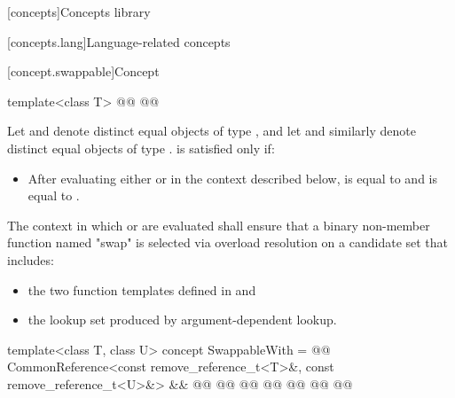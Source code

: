 
\setcounter{chapter}{21}
[concepts]{Concepts library}

\setcounter{section}{2}
[concepts.lang]{Language-related concepts}

\setcounter{subsection}{10}
[concept.swappable]{Concept }


%
\begin{itemdecl}
template<class T>
@@
@@
\end{itemdecl}

{\color{remclr}
\begin{itemdescr}
\pnum
Let  and  denote distinct equal objects of type ,
and let  and  similarly denote distinct equal objects of type
.  is satisfied only if:
\begin{itemize}
\item After evaluating either  or  in the
  context described below,  is equal to  and  is
  equal to .
\end{itemize}

\pnum
The context in which  or  are evaluated shall ensure that a binary non-member
function named "swap" is selected via overload resolution on a candidate set that includes:
\begin{itemize}
\item the two  function templates defined in  and
\item the lookup set produced by argument-dependent lookup.
\end{itemize}
\end{itemdescr}
} %

%
\begin{itemdecl}
template<class T, class U>
concept SwappableWith =
  @@
  CommonReference<const remove_reference_t<T>&, const remove_reference_t<U>&> &&
  @@
  @@
    @@
    @@
    @@
    @@
  @\added{\};}@
\end{itemdecl}

